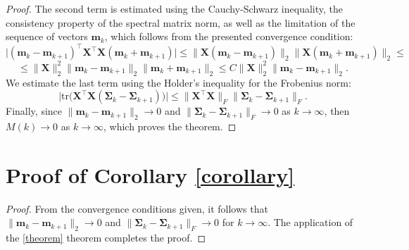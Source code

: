 \documentclass[runningheads]{llncs}
\begin{document}
\begin{proof}
    The second term is estimated using the Cauchy-Schwarz inequality, the consistency property of the spectral matrix norm, as well as the limitation of the sequence of vectors $\mathbf{m}_k$, which follows from the presented convergence condition:
\[\big| (\mathbf{m}_k - \mathbf{m}_{k+1})^{\top} \mathbf{X}^{\top}\mathbf{X} (\mathbf{m}_k + \mathbf{m}_{k+1}) \big| \leqslant \| \mathbf{X} (\mathbf{m}_k - \mathbf{m}_{k+1}) \|_2 \| \mathbf{X} (\mathbf{m}_k + \mathbf{m}_{k+1}) \|_2 \leqslant \]
    \[ \leqslant \| \mathbf{X} \|_2^2 \| \mathbf{m}_k - \mathbf{m}_{k+1} \|_2 \| \mathbf{m}_k + \mathbf{m}_{k+1} \|_2 \leqslant C \| \mathbf{X} \|_2^2 \| \mathbf{m}_k - \mathbf{m}_{k+1} \|_2. \]
    We estimate the last term using the Holder's inequality for the Frobenius norm:
    \[ \Big| \text{tr} \Big( \mathbf{X}^{\top}\mathbf{X} \left( \mathbf{\Sigma}_k - \mathbf{\Sigma}_{k+1} \right) \Big) \Big| \leqslant \| \mathbf{X}^{\top}\mathbf{X} \|_F \| \mathbf{\Sigma}_k - \mathbf{\Sigma}_{k+1} \|_F. \]
Finally, since $\|\mathbf{m}_k - \mathbf{m}_{k+1} \|_2\to 0$ and $\|\mathbf{\Sigma}_k - \mathbf{\Sigma}_{k+1}\|_{F}\to 0$ as $k\to\infty$, then $M(k)\to 0$ as $k\to \infty$, which proves the theorem.
\end{proof}

\section{Proof of Corollary \ref{corollary}}

\begin{proof}
    From the convergence conditions given, it follows that $\|\mathbf{m}_k - \mathbf{m}_{k+1} \|_2\to 0$ and $\|\mathbf{\Sigma}_k -\mathbf{\Sigma}_{k+1}\|_{F}\to 0$ for $k\to \infty$. The application of the \ref{theorem} theorem completes the proof.
\end{proof}
\end{document}
